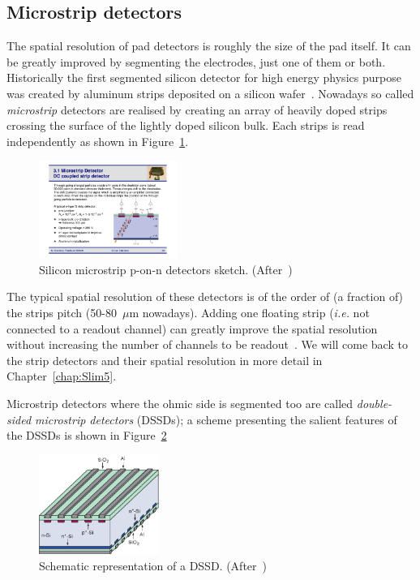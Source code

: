 \subsection{Microstrip detectors}
\label{sec:microstrips}
The spatial resolution of pad detectors is roughly the size of the pad itself.
 It can be greatly improved by segmenting the electrodes, just one of 
them or both. 
  Historically the first segmented silicon detector for high energy physics purpose was created by 
 aluminum strips deposited on a silicon wafer~\cite{Amendolia}. 
Nowadays so called {\it microstrip} detectors are realised by creating an array of heavily doped 
strips crossing the surface 
 of the lightly doped silicon bulk. Each strips is read independently as shown in Figure~\ref{fig:strips}.
 
 \begin{figure}[htbp]
   \centering
   \includegraphics[width=0.4\textwidth]{Strips.pdf} 
      \caption{\label{fig:strips} Silicon microstrip p-on-n detectors sketch. (After~\cite{Krammer})}
\end{figure}
 
 The typical spatial resolution of these detectors is of the order of (a fraction of) the strips pitch 
 (50-80~$\mu$m nowadays).
 Adding one floating strip ({\it i.e.} not connected to a readout channel) can greatly 
 improve the spatial resolution without increasing the number of channels to be 
 readout~\cite{TURCHETTA}. We will come back to the strip detectors and their spatial resolution in 
 more detail in 
 Chapter~\ref{chap:Slim5}.
 
 Microstrip detectors where  the ohmic side is segmented too  are called {\it double-sided microstrip 
 detectors} (DSSDs); a scheme presenting the salient features of the DSSDs is shown in 
 Figure~\ref{fig:DSSD}
  \begin{figure}[htbp]
   \centering
   \includegraphics[width=0.35\textwidth]{DSSD.pdf} 
      \caption{\label{fig:DSSD} Schematic representation of a DSSD. (After~\cite{Krammer})}
\end{figure}

